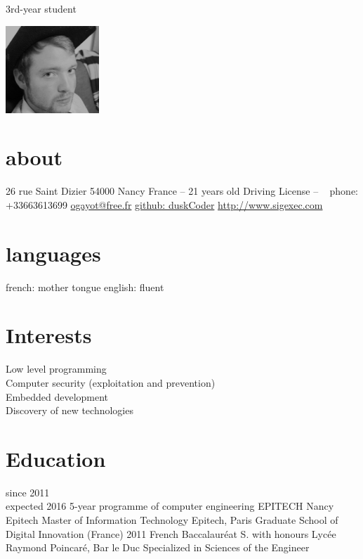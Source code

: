 \documentclass[]{friggeri-cv}
\begin{document}
       {3rd-year student}


\begin{aside}
    \includegraphics[width=100pt]{photo.png}
  \section{about}
    26 rue Saint Dizier
    54000 Nancy
    France
    --
    21 years old
    Driving License
    --
    ~
    phone: +33663613699
    \href{mailto:ogayot@free.fr}{ogayot@free.fr}
    \href{https://github.com/duskCoder}{github: duskCoder}
    \href{http://www.sigexec.com}{http://www.sigexec.com}
  \section{languages}
    french: mother tongue
    english: fluent
\end{aside}

\section{Interests}

Low level programming\\
Computer security (exploitation and prevention)\\
Embedded development\\
Discovery of new technologies

\section{Education}

\begin{entrylist}
  \entry
    {since 2011\\expected 2016}
    {5-year programme of computer engineering}
    {EPITECH Nancy}
    {Epitech Master of Information Technology Epitech, Paris Graduate School of Digital Innovation (France)}
  \entry
    {2011}
    {French Baccalauréat S. with honours}
    {Lycée Raymond Poincaré, Bar le Duc}
    {Specialized in Sciences of the Engineer}
\end{entrylist}
\end{document}
